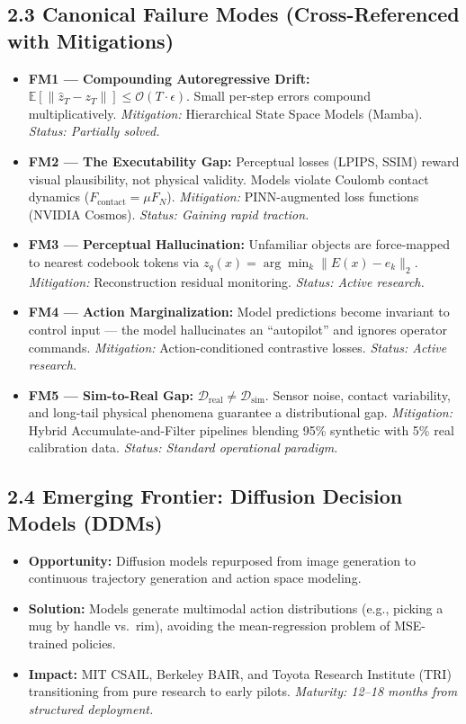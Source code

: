 \documentclass[11pt,a4paper]{article}
\begin{document}
\subsection{2.3 Canonical Failure Modes (Cross-Referenced with Mitigations)}
\begin{itemize}
    \item \textbf{FM1 --- Compounding Autoregressive Drift:} $\mathbb{E}[\|\hat{z}_T - z_T\|] \leq \mathcal{O}(T \cdot \epsilon)$. Small per-step errors compound multiplicatively. \textit{Mitigation:} Hierarchical State Space Models (Mamba). \textit{Status: Partially solved.}
    \item \textbf{FM2 --- The Executability Gap:} Perceptual losses (LPIPS, SSIM) reward visual plausibility, not physical validity. Models violate Coulomb contact dynamics ($F_{\text{contact}} = \mu F_N$). \textit{Mitigation:} PINN-augmented loss functions (NVIDIA Cosmos). \textit{Status: Gaining rapid traction.}
    \item \textbf{FM3 --- Perceptual Hallucination:} Unfamiliar objects are force-mapped to nearest codebook tokens via $z_q(x) = \arg\min_k \|E(x) - e_k\|_2$. \textit{Mitigation:} Reconstruction residual monitoring. \textit{Status: Active research.}
    \item \textbf{FM4 --- Action Marginalization:} Model predictions become invariant to control input --- the model hallucinates an ``autopilot'' and ignores operator commands. \textit{Mitigation:} Action-conditioned contrastive losses. \textit{Status: Active research.}
    \item \textbf{FM5 --- Sim-to-Real Gap:} $\mathcal{D}_{\text{real}} \neq \mathcal{D}_{\text{sim}}$. Sensor noise, contact variability, and long-tail physical phenomena guarantee a distributional gap. \textit{Mitigation:} Hybrid Accumulate-and-Filter pipelines blending 95\% synthetic with 5\% real calibration data. \textit{Status: Standard operational paradigm.}
\end{itemize}

\subsection{2.4 Emerging Frontier: Diffusion Decision Models (DDMs)}
\begin{itemize}
    \item \textbf{Opportunity:} Diffusion models repurposed from image generation to continuous trajectory generation and action space modeling.
    \item \textbf{Solution:} Models generate multimodal action distributions (e.g., picking a mug by handle vs.\ rim), avoiding the mean-regression problem of MSE-trained policies.
    \item \textbf{Impact:} MIT CSAIL, Berkeley BAIR, and Toyota Research Institute (TRI) transitioning from pure research to early pilots. \textit{Maturity: 12--18 months from structured deployment.}
\end{itemize}
\end{document}
